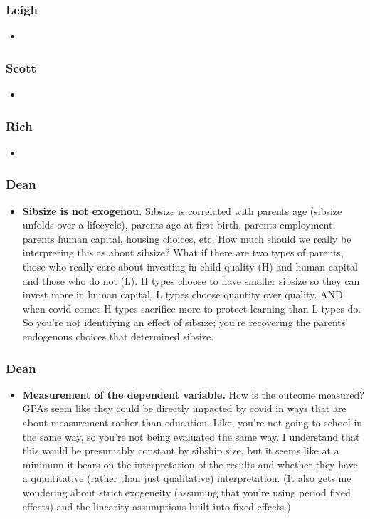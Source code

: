 \begin{frame}
        \label{frame:Leigh}
    \frametitle{Leigh}
    \begin{itemize}
        \item 
    \end{itemize}
\end{frame}

\begin{frame}
        \label{frame:Scott}
    \frametitle{Scott}
    \begin{itemize}
        \item 
    \end{itemize}
\end{frame}

\begin{frame}
        \label{frame:Rich}
    \frametitle{Rich}
    \begin{itemize}
        \item 
    \end{itemize}
\end{frame}


\begin{frame}
        \label{frame:dean}
    \frametitle{Dean}
    \begin{itemize}
        \item \textbf{Sibsize is not exogenou.}  Sibsize is correlated with parents age (sibsize unfolds over a lifecycle), parents age at first birth, parents employment, parents human capital, housing choices, etc. How much should we really be interpreting this as about sibsize? What if there are two types of parents, those who really care about investing in child quality (H) and human capital and those who do not (L). H types choose to have smaller sibsize so they can invest more in human capital, L types choose quantity over quality. AND when covid comes H types sacrifice more to protect learning than L types do. So you’re not identifying an effect of sibsize; you’re recovering the parents’ endogenous choices that determined sibsize.
    \end{itemize}
\end{frame}

\begin{frame}
        \label{frame:dean2}
    \frametitle{Dean}
    \begin{itemize}
        \item \textbf{Measurement of the dependent variable.}   How is the outcome measured? GPAs seem like they could be directly impacted by covid in ways that are about measurement rather than education. Like, you’re not going to school in the same way, so you’re not being evaluated the same way. I understand that this would be presumably constant by sibship size, but it seems like at a minimum it bears on the interpretation of the results and whether they have a quantitative (rather than just qualitative) interpretation. (It also gets me wondering about strict exogeneity (assuming that you’re using period fixed effects) and the linearity assumptions built into fixed effects.)
    \end{itemize}
\end{frame}

